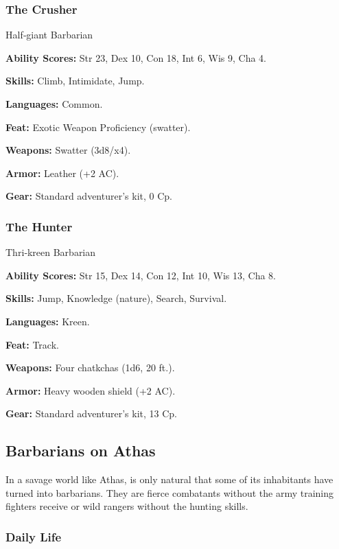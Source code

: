 \subsubsection{The Crusher}

Half‐giant Barbarian

\textbf{Ability Scores:} Str 23, Dex 10, Con 18, Int 6, Wis 9, Cha 4.

\textbf{Skills:} Climb, Intimidate, Jump.

\textbf{Languages:} Common.

\textbf{Feat:} Exotic Weapon Proficiency (swatter).

\textbf{Weapons:} Swatter (3d8/x4).

\textbf{Armor:} Leather (+2 AC).

\textbf{Gear:} Standard adventurer's kit, 0 Cp.

\subsubsection{The Hunter}

Thri‐kreen Barbarian

\textbf{Ability Scores:} Str 15, Dex 14, Con 12, Int 10, Wis 13, Cha 8.

\textbf{Skills:} Jump, Knowledge (nature), Search, Survival.

\textbf{Languages:} Kreen.

\textbf{Feat:} Track.

\textbf{Weapons:} Four chatkchas (1d6, 20 ft.).

\textbf{Armor:} Heavy wooden shield (+2 AC).

\textbf{Gear:} Standard adventurer's kit, 13 Cp.

\subsection{Barbarians on Athas}

In a savage world like Athas, is only natural that some of its inhabitants have turned into barbarians. They are fierce combatants without the army training fighters receive or wild rangers without the hunting skills.

\subsubsection{Daily Life}

